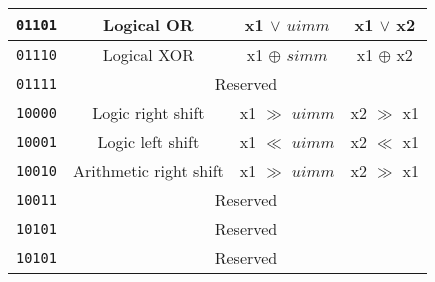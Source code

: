 \begin{center}
\begin{longtable}{|c|c|c|c|}
      \texttt{01101}                       &
      Logical OR                           &
      x1 $\lor$ $uimm$                     &
      x1 $\lor$ x2                         \\ \hline
                                           
      \texttt{01110}                       &
      Logical XOR                          &
      x1 $\oplus$ $simm$                   &
      x1 $\oplus$ x2                       \\ \hline
                                           
      \texttt{01111}                       &
      \multicolumn{3}{c|}{Reserved}        \\ \hline
                                       
      \texttt{10000}                       &
      Logic right shift                    &
      x1 $\gg$ $uimm$                      &
      x2 $\gg$ x1                          \\ \hline
                                           
      \texttt{10001}                       &
      Logic left shift                     &
      x1 $\ll$ $uimm$                      &
      x2 $\ll$ x1                          \\ \hline
                                           
      \texttt{10010}                       &                      
      Arithmetic right shift               &
      x1 $\gg$ $uimm$                      &
      x2 $\gg$ x1                          \\ \hline

      \texttt{10011}                       &
      \multicolumn{3}{c|}{Reserved}        \\ \hline

      \texttt{10101}                       &
      \multicolumn{3}{c|}{Reserved}        \\ \hline

      \texttt{10101}                       &
      \multicolumn{3}{c|}{Reserved}        \\ \hline


\end{longtable}
\end{center}
